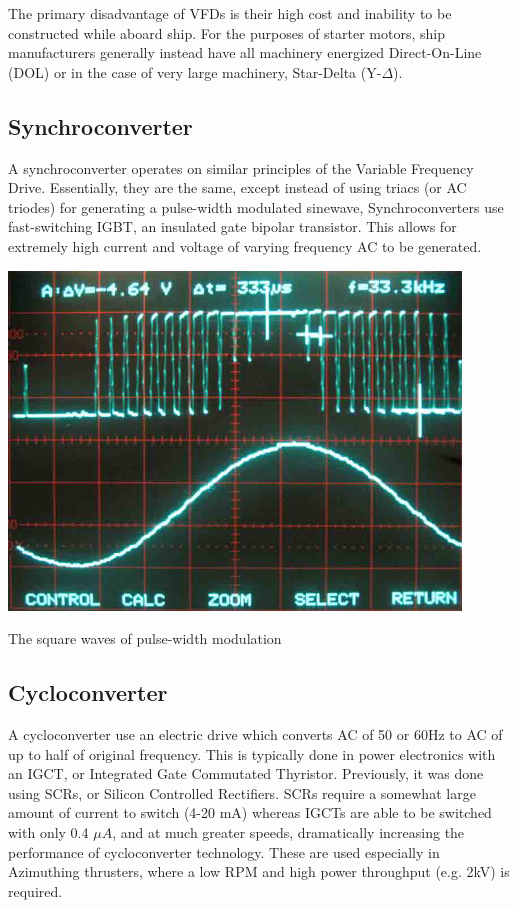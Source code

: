 \documentclass[11pt,a4paper]{article}
\begin{document}
The primary disadvantage of VFDs is their high cost and inability to be constructed while aboard ship. For the purposes of starter motors, ship manufacturers generally instead have all machinery energized Direct-On-Line (DOL) or in the case of very large machinery, Star-Delta (Y-$\Delta$).

\subsection{Synchroconverter}
A synchroconverter operates on similar principles of the Variable Frequency Drive. Essentially, they are the same, except instead of using triacs (or AC triodes) for generating a pulse-width modulated sinewave, Synchroconverters use fast-switching IGBT, an insulated gate bipolar transistor. This allows for extremely high current and voltage of varying frequency AC to be generated.
\begin{center}
\includegraphics[width=12cm]{pwm.jpg}\par
The square waves of pulse-width modulation
\end{center}
\subsection{Cycloconverter}
A cycloconverter use an electric drive which converts AC of 50 or 60Hz to AC of up to half of original frequency. This is typically done in power electronics with an IGCT, or Integrated Gate Commutated Thyristor. Previously, it was done using SCRs, or Silicon Controlled Rectifiers. SCRs require a somewhat large amount of current to switch (4-20 mA) whereas IGCTs are able to be switched with only 0.4 $\mu A$, and at much greater speeds, dramatically increasing the performance of cycloconverter technology. These are used especially in Azimuthing thrusters, where a low RPM and high power throughput (e.g. 2kV) is required.
\end{document}
